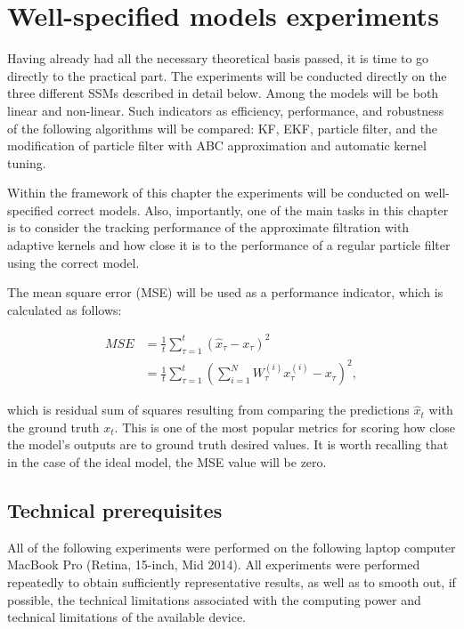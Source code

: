 \chapter{Well-specified models experiments}
\label{chap:well_specified}

Having already had all the necessary theoretical basis passed, it is time to go directly to the practical part. The experiments will be conducted directly on the three different SSMs described in detail below. Among the models will be both linear and non-linear. Such indicators as efficiency, performance, and robustness of the following algorithms will be compared: KF, EKF, particle filter, and the modification of particle filter with ABC approximation and automatic kernel tuning.

Within the framework of this chapter the experiments will be conducted on well-specified correct models. Also, importantly, one of the main tasks in this chapter is to consider the tracking performance of the approximate filtration with adaptive kernels and how close it is to the performance of a regular particle filter using the correct model.

The mean square error (MSE) will be used as a performance indicator, which is calculated as follows:

\begin{equation}
    \begin{aligned}
        M S E &=\frac{1}{t} \sum_{\tau=1}^t\left(\hat{x}_\tau-x_\tau\right)^2 \\
        &=\frac{1}{t} \sum_{\tau=1}^t\left(\sum_{i=1}^N W_\tau^{(i)} x_\tau^{(i)}-x_\tau\right)^2,
\end{aligned}
\end{equation}

\noindent which is residual sum of squares resulting from comparing the predictions \(\hat{x}_t\) with the ground truth \(x_t\). This is one of the most popular metrics for scoring how close the model's outputs are to ground truth desired values. It is worth recalling that in the case of the ideal model, the MSE value will be zero.

\section{Technical prerequisites}
All of the following experiments were performed on the following laptop computer MacBook Pro (Retina, 15-inch, Mid 2014). All experiments were performed repeatedly to obtain sufficiently representative results, as well as to smooth out, if possible, the technical limitations associated with the computing power and technical limitations of the available device.

